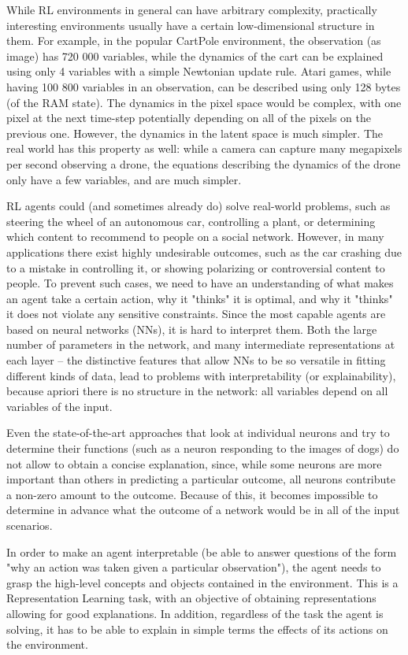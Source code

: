 \documentclass[a4paper,11pt,oneside]{report}
\begin{document}
While RL environments in general can have arbitrary complexity, practically interesting environments usually have a certain low-dimensional structure in them. For example, in the popular CartPole environment, the observation (as image) has 720 000 variables, while the dynamics of the cart can be explained using only 4 variables with a simple Newtonian update rule. Atari games, while having 100 800 variables in an observation, can be described using only 128 bytes (of the RAM state). The dynamics in the pixel space would be complex, with one pixel at the next time-step potentially depending on all of the pixels on the previous one. However, the dynamics in the latent space is much simpler. The real world has this property as well: while a camera can capture many megapixels per second observing a drone, the equations describing the dynamics of the drone only have a few variables, and are much simpler.


RL agents could (and sometimes already do) solve real-world problems, such as steering the wheel of an autonomous car, controlling a plant, or determining which content to recommend to people on a social network. However, in many applications there exist highly undesirable outcomes, such as the car crashing due to a mistake in controlling it, or showing polarizing or controversial content to people. To prevent such cases, we need to have an understanding of what makes an agent take a certain action, why it "thinks" it is optimal, and why it "thinks" it does not violate any sensitive constraints. Since the most capable agents are based on neural networks (NNs), it is hard to interpret them. Both the large number of parameters in the network, and many intermediate representations at each layer -- the distinctive features that allow NNs to be so versatile in fitting different kinds of data, lead to problems with interpretability (or explainability), because apriori there is no structure in the network: all variables depend on all variables of the input.

Even the state-of-the-art approaches that look at individual neurons and try to determine their functions (such as a neuron responding to the images of dogs) do not allow to obtain a concise explanation, since, while some neurons are more important than others in predicting a particular outcome, all neurons contribute a non-zero amount to the outcome. Because of this, it becomes impossible to determine in advance what the outcome of a network would be in all of the input scenarios.

In order to make an agent interpretable (be able to answer questions of the form "why an action was taken given a particular observation"), the agent needs to grasp the high-level concepts and objects contained in the environment. This is a Representation Learning task, with an objective of obtaining representations allowing for good explanations. In addition, regardless of the task the agent is solving, it has to be able to explain in simple terms the effects of its actions on the environment.
\end{document}
